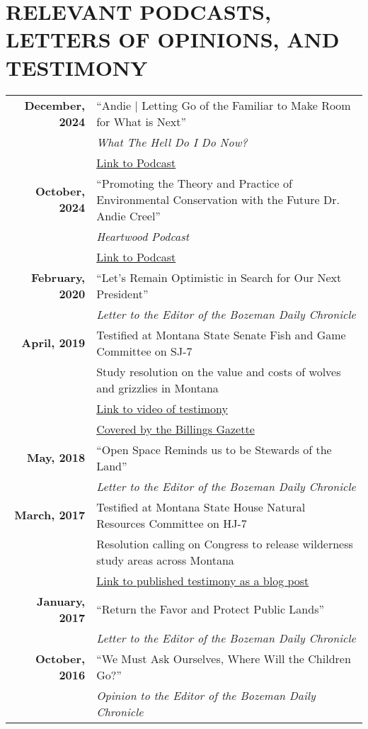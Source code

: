\documentclass[11pt]{article}
\begin{document}
\section*{RELEVANT PODCASTS, LETTERS OF OPINIONS, AND TESTIMONY}
\begin{longtable}{>{\bfseries}r p{5.5in}}%
December, 2024 & “Andie | Letting Go of the Familiar to Make Room for What is Next” \\
    & \textit{What The Hell Do I Do Now?}\\
    & \href{https://open.spotify.com/episode/7bswDIxoYApUMYuF7UPw6C?si=b8d9c4fdcc804742}{Link to Podcast} \\[1ex]
October, 2024 & “Promoting the Theory and Practice of Environmental Conservation with the Future Dr. Andie Creel” \\
    & \textit{Heartwood Podcast} \\
    & \href{https://podcasts.apple.com/us/podcast/heartwood/id1474971310?i=1000673543724}{Link to Podcast} \\[1ex]
February, 2020 & “Let’s Remain Optimistic in Search for Our Next President” \\
    & \textit{Letter to the Editor of the Bozeman Daily Chronicle} \\[1ex]
April, 2019 & Testified at Montana State Senate Fish and Game Committee on SJ-7 \\
    & Study resolution on the value and costs of wolves and grizzlies in Montana \\
    & \href{https://www.facebook.com/watch/?v=2242142425832448}{Link to video of testimony} \\
    & \href{https://billingsgazette.com/outdoors/montana-could-study-of-economic-costs-benefits-of-wolves-grizzlies/article_4cba1d42-20a7-535b-a06c-49b800b1fe67.html?fbclid=IwAR2AH4iV9oVMiqb84HeFRVAxnHxhk-furTRHPYwgPYg9yOZv9gZg9rW6eJ4}{Covered by the Billings Gazette} \\[1ex]
May, 2018 & “Open Space Reminds us to be Stewards of the Land” \\
    & \textit{Letter to the Editor of the Bozeman Daily Chronicle}\\[1ex]
March, 2017 & Testified at Montana State House Natural Resources Committee on HJ-7 \\
    & Resolution calling on Congress to release wilderness study areas across Montana \\
    & \href{https://linktoblogpost.com}{Link to published testimony as a blog post} \\[1ex]
January, 2017 & “Return the Favor and Protect Public Lands” \\
    & \textit{Letter to the Editor of the Bozeman Daily Chronicle} \\[1ex]
October, 2016 & “We Must Ask Ourselves, Where Will the Children Go?” \\
    & \textit{Opinion to the Editor of the Bozeman Daily Chronicle} \\
\end{longtable}
\end{document}
